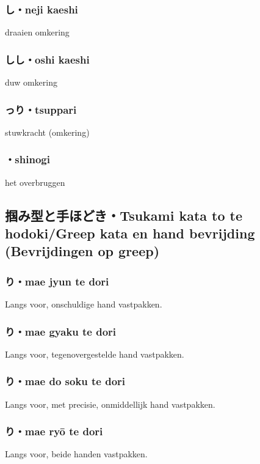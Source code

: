 \subsubsection{し・neji kaeshi}
draaien omkering

\subsubsection{しし・oshi kaeshi}
duw omkering

\subsubsection{っり・tsuppari}
stuwkracht (omkering)

\subsubsection{・shinogi}
het overbruggen

\subsection{掴み型と手ほどき・Tsukami kata to te hodoki/Greep kata en hand bevrijding (Bevrijdingen op greep)}
\subsubsection{り・mae jyun te dori}
Langs voor, onschuldige hand vastpakken.

\subsubsection{り・mae gyaku te dori}
Langs voor, tegenovergestelde hand vastpakken.

\subsubsection{り・mae do soku te dori}
Langs voor, met precisie, onmiddellijk hand vastpakken.

\subsubsection{り・mae ry\={o} te dori}
Langs voor, beide handen vastpakken.

